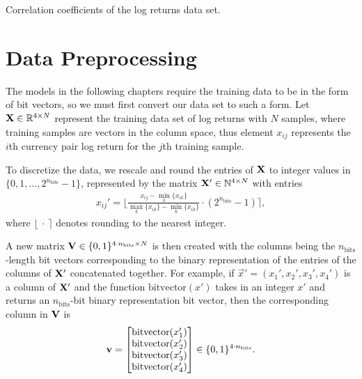 \begin{table}[!htb]
    \centering
    \begin{adjustbox}{max width=\textwidth}
        
    \end{adjustbox}
    \caption{Correlation coefficients of the log returns data set.}
    \label{tbl:data_correlation_coefficients}
\end{table}


\section{Data Preprocessing}
The models in the following chapters require the training data to be in the form of bit vectors, so we must first convert our data set to such a form.
Let \( \mathbf{X} \in \mathbb{R}^{4 \times N} \) represent the training data set of log returns with \( N \) samples, where training samples are vectors in the column space, thus element \( x_{ij} \) represents the \( i \)th currency pair log return for the \( j \)th training sample.

To discretize the data, we rescale and round the entries of \( \mathbf{X} \) to integer values in \( \{0, 1, \dots, 2^{n_\text{bits}} - 1\} \), represented by the matrix \( \mathbf{X}' \in \mathbb{N}^{4 \times N} \) with entries
\begin{align}
    x_{ij}' = \bigg\lfloor \frac{x_{ij} - \min_k \{x_{ik}\}}{\max_k \{x_{ik}\} - \min_k \{x_{ik}\}} \cdot (2^{n_\text{bits}} - 1) \bigg\rceil,
\end{align}
where \( \lfloor \ \cdot \ \rceil \) denotes rounding to the nearest integer.

A new matrix \( \mathbf{V} \in \{0,1\}^{4\cdot n_\text{bits} \times N} \) is then created with the columns being the \( n_\text{bits} \)-length bit vectors corresponding to the binary representation of the entries of the columns of \( \mathbf{X}' \) concatenated together.
For example, if \( \vec{x}' = (x_1',x_2',x_3',x_4') \) is a column of \( \mathbf{X}' \) and the function \( \text{bitvector}(x') \) takes in an integer \( x' \) and returns an \( n_\text{bits} \)-bit binary representation bit vector, then the corresponding column in \( \mathbf{V} \) is
\begin{align}
    \mathbf{v} = \begin{bmatrix}
        \text{bitvector}(x_1') \\
        \text{bitvector}(x_2') \\
        \text{bitvector}(x_3') \\
        \text{bitvector}(x_4') \\
    \end{bmatrix}
    \in \{0,1\}^{4\cdot n_\text{bits}}.
\end{align}

